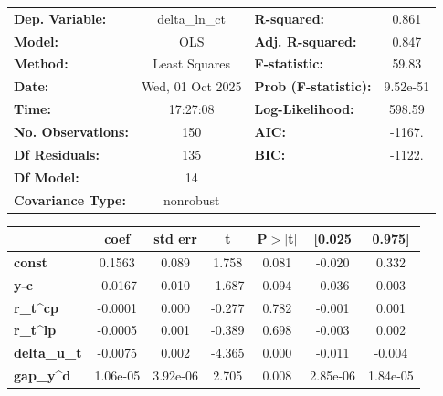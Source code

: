 \begin{center}
\begin{tabular}{lclc}
\toprule
\textbf{Dep. Variable:}    &  delta\_ln\_ct   & \textbf{  R-squared:         } &     0.861   \\
\textbf{Model:}            &       OLS        & \textbf{  Adj. R-squared:    } &     0.847   \\
\textbf{Method:}           &  Least Squares   & \textbf{  F-statistic:       } &     59.83   \\
\textbf{Date:}             & Wed, 01 Oct 2025 & \textbf{  Prob (F-statistic):} &  9.52e-51   \\
\textbf{Time:}             &     17:27:08     & \textbf{  Log-Likelihood:    } &    598.59   \\
\textbf{No. Observations:} &         150      & \textbf{  AIC:               } &    -1167.   \\
\textbf{Df Residuals:}     &         135      & \textbf{  BIC:               } &    -1122.   \\
\textbf{Df Model:}         &          14      & \textbf{                     } &             \\
\textbf{Covariance Type:}  &    nonrobust     & \textbf{                     } &             \\
\bottomrule
\end{tabular}
\begin{tabular}{lcccccc}
                     & \textbf{coef} & \textbf{std err} & \textbf{t} & \textbf{P$> |$t$|$} & \textbf{[0.025} & \textbf{0.975]}  \\
\midrule
\textbf{const}       &       0.1563  &        0.089     &     1.758  &         0.081        &       -0.020    &        0.332     \\
\textbf{y-c}         &      -0.0167  &        0.010     &    -1.687  &         0.094        &       -0.036    &        0.003     \\
\textbf{r\_t^cp}     &      -0.0001  &        0.000     &    -0.277  &         0.782        &       -0.001    &        0.001     \\
\textbf{r\_t^lp}     &      -0.0005  &        0.001     &    -0.389  &         0.698        &       -0.003    &        0.002     \\
\textbf{delta\_u\_t} &      -0.0075  &        0.002     &    -4.365  &         0.000        &       -0.011    &       -0.004     \\
\textbf{gap\_y^d}    &     1.06e-05  &     3.92e-06     &     2.705  &         0.008        &     2.85e-06    &     1.84e-05     \\

\end{tabular}
\end{center}
